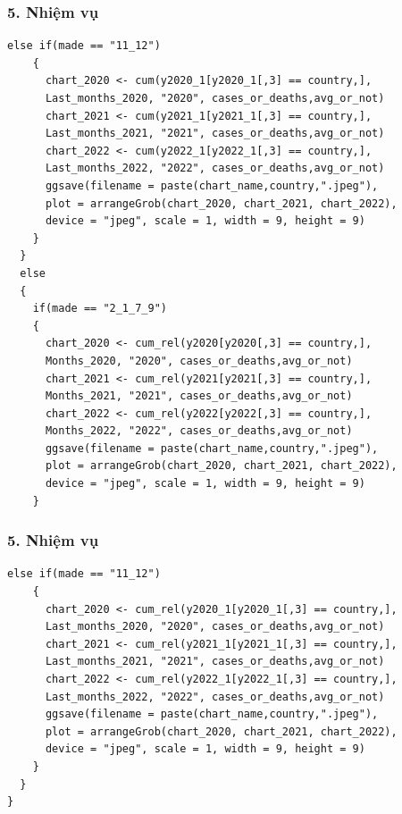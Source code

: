 \documentclass[english,10pt,table]{beamer}
\begin{document}
\begin{frame}[fragile]
\frametitle{5.  Nhiệm vụ}
\begin{lstlisting}[frame = single,basicstyle=\tiny]
 else if(made == "11_12")
    {
      chart_2020 <- cum(y2020_1[y2020_1[,3] == country,], 
      Last_months_2020, "2020", cases_or_deaths,avg_or_not)
      chart_2021 <- cum(y2021_1[y2021_1[,3] == country,], 
      Last_months_2021, "2021", cases_or_deaths,avg_or_not)
      chart_2022 <- cum(y2022_1[y2022_1[,3] == country,], 
      Last_months_2022, "2022", cases_or_deaths,avg_or_not)
      ggsave(filename = paste(chart_name,country,".jpeg"), 
      plot = arrangeGrob(chart_2020, chart_2021, chart_2022), 
      device = "jpeg", scale = 1, width = 9, height = 9)
    }
  }
  else 
  {
    if(made == "2_1_7_9")
    {
      chart_2020 <- cum_rel(y2020[y2020[,3] == country,], 
      Months_2020, "2020", cases_or_deaths,avg_or_not)
      chart_2021 <- cum_rel(y2021[y2021[,3] == country,],
      Months_2021, "2021", cases_or_deaths,avg_or_not)
      chart_2022 <- cum_rel(y2022[y2022[,3] == country,], 
      Months_2022, "2022", cases_or_deaths,avg_or_not)
      ggsave(filename = paste(chart_name,country,".jpeg"), 
      plot = arrangeGrob(chart_2020, chart_2021, chart_2022), 
      device = "jpeg", scale = 1, width = 9, height = 9)
    }
\end{lstlisting}
\end{frame}

\begin{frame}[fragile]
\frametitle{5.  Nhiệm vụ}
\begin{lstlisting}[frame = single,basicstyle=\tiny]
  else if(made == "11_12")
    {
      chart_2020 <- cum_rel(y2020_1[y2020_1[,3] == country,], 
      Last_months_2020, "2020", cases_or_deaths,avg_or_not)
      chart_2021 <- cum_rel(y2021_1[y2021_1[,3] == country,], 
      Last_months_2021, "2021", cases_or_deaths,avg_or_not)
      chart_2022 <- cum_rel(y2022_1[y2022_1[,3] == country,], 
      Last_months_2022, "2022", cases_or_deaths,avg_or_not)
      ggsave(filename = paste(chart_name,country,".jpeg"), 
      plot = arrangeGrob(chart_2020, chart_2021, chart_2022), 
      device = "jpeg", scale = 1, width = 9, height = 9)
    }
  }
}
\end{lstlisting}
\end{frame}
\end{document}
